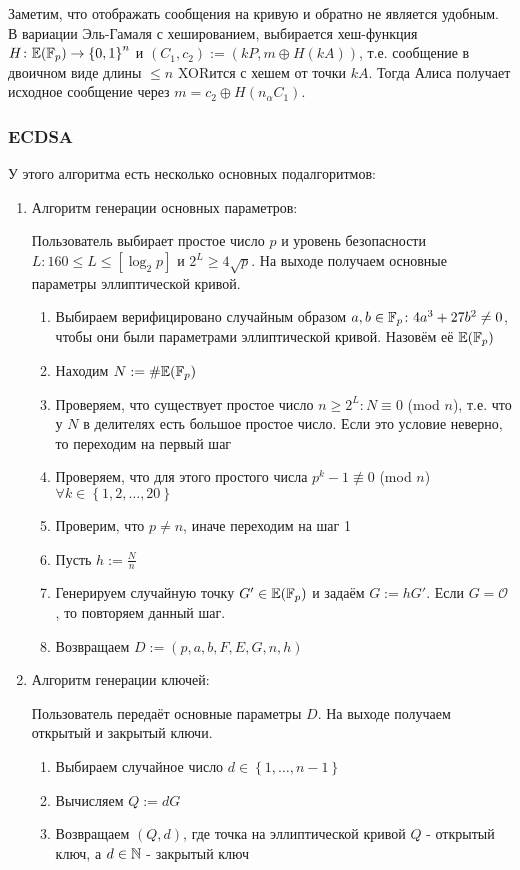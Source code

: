 \documentclass{article}
\begin{document}
  Заметим, что отображать сообщения на кривую и обратно не является удобным. В вариации Эль-Гамаля с хешированием, выбирается хеш-функция $H\colon \mathbb{E}(\mathbb{F}_p)\to \left\{0,1\right\}^n$ и $(C_1,c_2) := (kP, m \oplus H(kA))$, т.е. сообщение в двоичном виде длины $\leqslant n$ XORится с хешем от точки $kA$. Тогда Алиса получает исходное сообщение через $m = c_2 \oplus H(n_\alpha C_1)$. 
  \subsubsection{ECDSA}
    У этого алгоритма есть несколько основных подалгоритмов:
    \begin{enumerate}
      \item Алгоритм генерации основных параметров: 

      Пользователь выбирает простое число $p$ и уровень безопасности $L\colon 160\leqslant L\leqslant [\log_2 p]$ и $2^L\geqslant 4 \sqrt{p}$. На выходе получаем основные параметры эллиптической кривой.

      \begin{enumerate}
        \item Выбираем верифицировано случайным образом $a,b\in \mathbb{F}_p\colon 4a^3+27b^2\neq 0$, чтобы они были параметрами эллиптической кривой. Назовём её $\mathbb{E}(\mathbb{F}_p)$
        \item Находим $N:=\#\mathbb{E}(\mathbb{F}_p)$
        \item Проверяем, что существует простое число $n\geqslant 2^L\colon N \equiv 0$ (mod $n$), т.е. что у $N$ в делителях есть большое простое число. Если это условие неверно, то переходим на первый шаг
        \item Проверяем, что для этого простого числа $p^k-1\not\equiv 0$ (mod $n$) $\forall k\in \left\{1,2,\dots,20\right\}$
        \item Проверим, что $p\neq n$, иначе переходим на шаг 1
        \item Пусть $h:=\frac{N}{n}$
        \item Генерируем случайную точку $G'\in \mathbb{E}(\mathbb{F}_p)$ и задаём $G:=hG'$. Если $G=\mathcal{O}$, то повторяем данный шаг.
        \item Возвращаем $D:=(p, a, b, F, E, G, n, h)$
      \end{enumerate}
      \item Алгоритм генерации ключей:

      Пользователь передаёт основные параметры $D$. На выходе получаем открытый и закрытый ключи.

      \begin{enumerate}
        \item Выбираем случайное число $d\in \left\{1,\dots,n-1\right\}$
        \item Вычисляем $Q:=dG$
        \item Возвращаем $(Q,d)$, где точка на эллиптической кривой $Q$ - открытый ключ, а $d\in\mathbb{N}$ - закрытый ключ
      \end{enumerate}


\end{enumerate}
\end{document}
